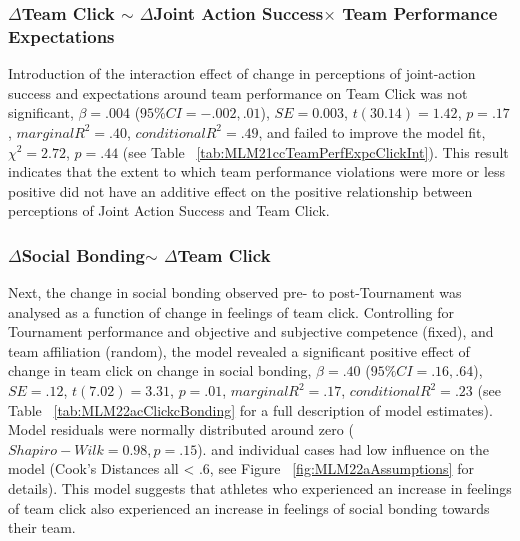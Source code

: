 \documentclass[12pt]{report}
\begin{document}
{%


\subsubsection{$\Delta$Team Click $\sim$ $\Delta$Joint Action Success$\times$ Team Performance Expectations}

Introduction of the interaction effect of change in perceptions of joint-action success and expectations around team performance on Team Click was not significant, $\beta = .004$ ($95\% CI =  -.002, .01$), $SE = 0.003$, $t(30.14) = 1.42$, $p = .17$, $marginal R^2 = .40$, $conditional R^2 = .49$, and failed to improve the model fit, $\chi^2 = 2.72$, $ p = .44$ (see Table ~\ref{tab:MLM21ccTeamPerfExpcClickInt}).  This result indicates that the extent to which team performance violations were more or less positive did not have an additive effect on the positive relationship between perceptions of Joint Action Success and Team Click.



\subsubsection{$\Delta$Social Bonding$\sim$ $\Delta$Team Click}
Next, the change in social bonding observed pre- to post-Tournament was analysed as a function of change in feelings of team click. Controlling for Tournament performance and  objective and subjective competence (fixed), and team affiliation (random), the model revealed a significant positive effect of change in team click on change in social bonding, $\beta = .40$ ($95\% CI =  .16, .64$), $SE = .12$, $t(7.02) = 3.31$, $p = .01$, $marginal R^2 = .17$, $conditional R^2 = .23$ (see Table ~\ref{tab:MLM22acClickcBonding} for a full description of model estimates).  Model residuals were normally distributed around zero ($Shapiro-Wilk = 0.98, p = .15$). and individual cases had low influence on the model (Cook's Distances all < .6, see Figure ~\ref{fig:MLM22aAssumptions} for details). This model suggests that athletes who experienced an increase in feelings of team click also experienced an increase in feelings of social bonding towards their team.




}
\end{document}
